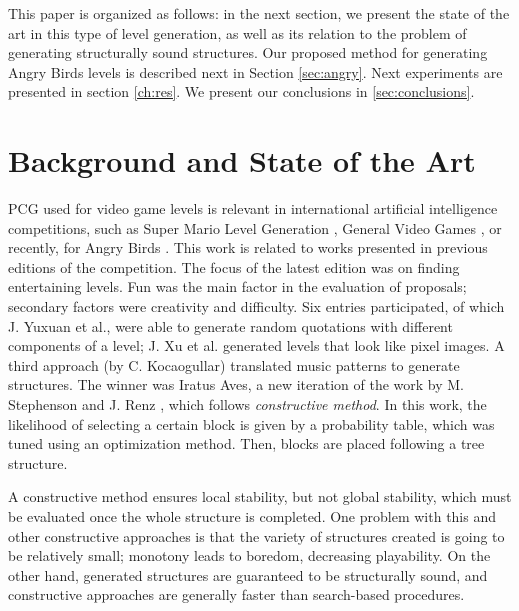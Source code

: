 \documentclass[a4paper,twoside]{article}
\begin{document}
This paper is organized as follows: in the next section, we present the state of the art in this type of level generation, as well as its relation to the problem of generating structurally sound structures. Our proposed method for generating Angry Birds levels is described next in Section \ref{sec:angry}. Next experiments are presented in section \ref{ch:res}. We present our conclusions in \ref{sec:conclusions}. 


\section{Background and State of the Art}
\label{sec:soa}

PCG used for video game levels is relevant in international artificial intelligence competitions, such as Super Mario Level Generation \cite{MarioAI_Level_12}, General Video Games \cite{GAIG_LevelGeneration_18,Khalifa_GVGLG_16}, or recently, for Angry Birds \cite{AngryBirds_LevelGeneration_18}. This work is related to works presented in previous editions of the competition.  The focus of the latest edition \cite{AngryBirds_LevelGeneration_18} was on finding entertaining levels. Fun was the main factor in the evaluation of proposals; secondary factors were creativity and difficulty.  Six entries participated, of which J. Yuxuan et al., were able to generate random quotations with different components of a level; J. Xu et al. generated levels that look like pixel images. A third approach (by C. Kocaogullar) translated music patterns to generate structures. The winner was Iratus Aves, a new iteration of the work by M. Stephenson and J. Renz \cite{stephenson2017generating,stephenson2016procedural}, which follows \textit{constructive method}. In this work, the likelihood of selecting a certain block is given by a probability table, which was tuned using an optimization method. Then, blocks are placed following a tree structure.

A constructive method ensures local stability, but not global stability, which must be evaluated once the whole structure is completed. One problem with this and other constructive approaches is that the variety of structures created is going to be relatively small; monotony leads to boredom, decreasing playability. On the other hand, generated structures are guaranteed to be structurally sound, and constructive approaches are generally faster than search-based procedures.
\end{document}
